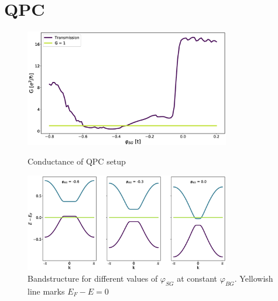 \documentclass[a4paper]{article}
\begin{document}

\section{QPC}
\begin{figure}[h!]
\centering
\includegraphics[width=0.8\textwidth]{qpc-conductance}
\caption{Conductance of QPC setup}
\includegraphics[width=0.8\textwidth]{bands-transition}
\caption{Bandstructure for different values of $\varphi_{SG}$ at constant $\varphi_{BG}$. Yellowish line marks $E_F - E = 0$}
\end{figure}
\end{document}
